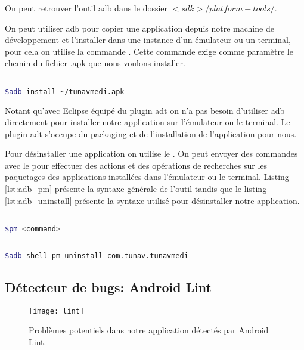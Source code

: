 On peut retrouver l'outil \gls{adb} dans le dossier $<sdk>/platform-tools/$.

On peut utiliser \gls{adb} pour copier une application depuis notre machine de développement et l'installer dans une instance d'un émulateur ou un terminal, pour cela on utilise la commande . Cette commande exige comme paramètre le chemin du fichier .apk que nous voulons installer.


\begin{lstlisting}[language=bash, label=lst:adb_install, caption=Exemple d'utilisation du commande adb install]

$adb install ~/tunavmedi.apk

\end{lstlisting}

Notant qu'avec Eclipse équipé du plugin \gls{adt} on n'a pas besoin d'utiliser
\gls{adb} directement pour installer notre application sur l'émulateur ou le
terminal. Le plugin \gls{adt} s'occupe du packaging et de l'installation de
l'application pour nous.


Pour désinstaller une application on utilise le . On peut
envoyer des commandes avec le  pour effectuer des actions et
des opérations de recherches sur les paquetages des applications installées dans
l'émulateur ou le terminal. Listing \ref{lst:adb_pm} présente la syntaxe
générale de l'outil tandis que le listing \ref{lst:adb_uninstall} présente la
syntaxe utilisé pour désinstaller notre application.


\begin{lstlisting}[language=bash, label=lst:adb_pm, caption=Syntaxe générale de l'utilisation du Package Manager]

$pm <command>

\end{lstlisting}

\begin{lstlisting}[language=bash, label=lst:adb_uninstall, caption=Exemple de désinstallation]

$adb shell pm uninstall com.tunav.tunavmedi

\end{lstlisting}

\subsection{Détecteur de bugs: Android Lint}

\begin{figure}[H]
\center
\texttt{[image: lint]}
\caption{Problèmes potentiels dans notre application détectés par Android Lint.}
\label{fig:lint}
\end{figure}

